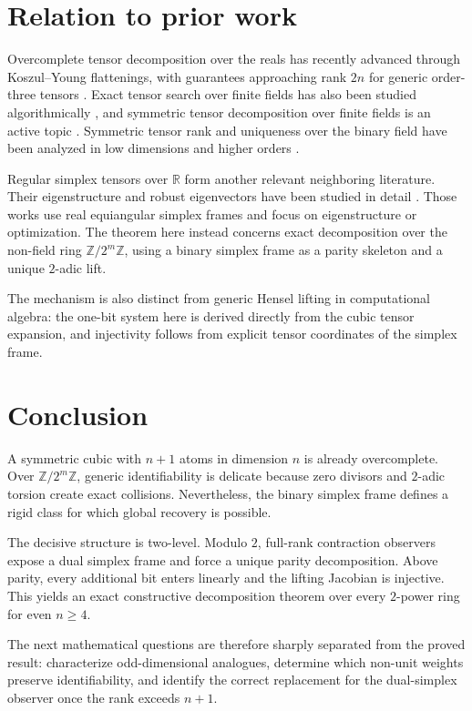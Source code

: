 \documentclass[11pt]{article}
\theoremstyle{definition}
\newcommand{\Z}{\mathbb{Z}}
\begin{document}
\section{Relation to prior work}
Overcomplete tensor decomposition over the reals has recently advanced through Koszul--Young flattenings, with guarantees approaching rank $2n$ for generic order-three tensors \cite{KothariMoitraWein2025}. Exact tensor search over finite fields has also been studied algorithmically \cite{Yang2025}, and symmetric tensor decomposition over finite fields is an active topic \cite{CotardoZullo2026}. Symmetric tensor rank and uniqueness over the binary field have been analyzed in low dimensions and higher orders \cite{SongZhengHuang2022}.

Regular simplex tensors over $\mathbb{R}$ form another relevant neighboring literature. Their eigenstructure and robust eigenvectors have been studied in detail \cite{CzaplinskiRaaschSteinberg2023,WangGengZhang2023}. Those works use real equiangular simplex frames and focus on eigenstructure or optimization. The theorem here instead concerns exact decomposition over the non-field ring $\Z/2^m\Z$, using a binary simplex frame as a parity skeleton and a unique $2$-adic lift.

The mechanism is also distinct from generic Hensel lifting in computational algebra: the one-bit system here is derived directly from the cubic tensor expansion, and injectivity follows from explicit tensor coordinates of the simplex frame.

\section{Conclusion}
A symmetric cubic with $n+1$ atoms in dimension $n$ is already overcomplete. Over $\Z/2^m\Z$, generic identifiability is delicate because zero divisors and $2$-adic torsion create exact collisions. Nevertheless, the binary simplex frame defines a rigid class for which global recovery is possible.

The decisive structure is two-level. Modulo $2$, full-rank contraction observers expose a dual simplex frame and force a unique parity decomposition. Above parity, every additional bit enters linearly and the lifting Jacobian is injective. This yields an exact constructive decomposition theorem over every $2$-power ring for even $n\ge4$.

The next mathematical questions are therefore sharply separated from the proved result: characterize odd-dimensional analogues, determine which non-unit weights preserve identifiability, and identify the correct replacement for the dual-simplex observer once the rank exceeds $n+1$.
\end{document}
